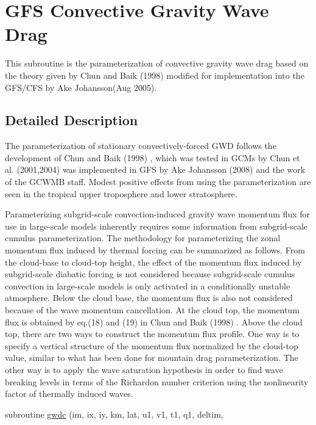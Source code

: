 \hypertarget{group___g_f_s__cgwd}{}\section{G\+FS Convective Gravity Wave Drag}
\label{group___g_f_s__cgwd}


This subroutine is the parameterization of convective gravity wave drag based on the theory given by Chun and Baik (1998) \cite{chun_and_baik_1998} modified for implementation into the G\+F\+S/\+C\+FS by Ake Johansson(\+Aug 2005).  




\subsection{Detailed Description}

\begin{DoxyItemize}
\item The parameterization of stationary convectively-\/forced G\+WD follows the development of Chun and Baik (1998) \cite{chun_and_baik_1998} , which was tested in G\+C\+Ms by Chun et al. (2001,2004) \cite{chun_et_al_2001} \cite{chun_et_al_2004} was implemented in G\+FS by Ake Johansson (2008) and the work of the G\+C\+W\+MB staff. Modest positive effects from using the parameterization are seen in the tropical upper troposphere and lower stratosphere.
\end{DoxyItemize}

Parameterizing subgrid-\/scale convection-\/induced gravity wave momentum flux for use in large-\/scale models inherently requires some information from subgrid-\/scale cumulus parameterization. The methodology for parameterizing the zonal momentum flux induced by thermal forcing can be summarized as follows. From the cloud-\/base to cloud-\/top height, the effect of the momentum flux induced by subgrid-\/scale diabatic forcing is not considered because subgrid-\/scale cumulus convection in large-\/scale models is only activated in a conditionally unstable atmosphere. Below the cloud base, the momentum flux is also not considered because of the wave momentum cancellation. At the cloud top, the momentum flux is obtained by eq.(18) and (19) in Chun and Baik (1998) \cite{chun_and_baik_1998}. Above the cloud top, there are two ways to construct the momentum flux profile. One way is to specify a vertical structure of the momentum flux normalized by the cloud-\/top value, similar to what has been done for mountain drag parameterization. The other way is to apply the wave saturation hypothesis in order to find wave breaking levels in terms of the Richardon number criterion using the nonlinearity factor of thermally induced waves. \begin{DoxyCompactItemize}
\item 
subroutine \hyperlink{group___g_f_s__cgwd_ga722b7730110e3c91524ccf414eab9dfe}{gwdc} (im, ix, iy, km, lat, u1, v1, t1, q1, deltim,
\end{DoxyCompactItemize}


